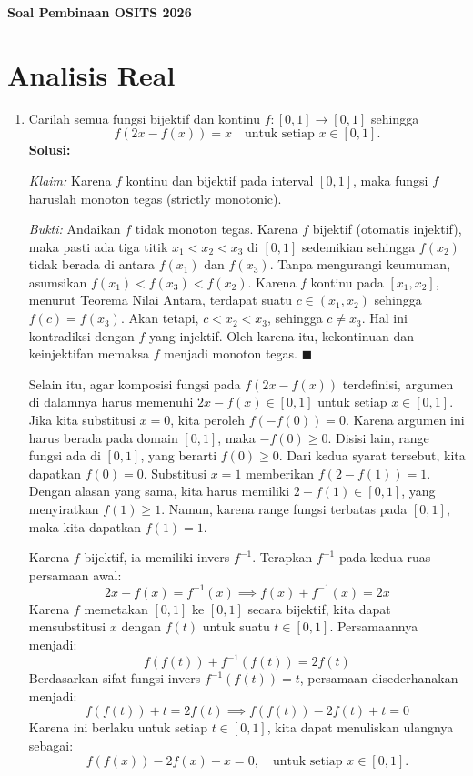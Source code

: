 \documentclass[11pt,a4paper]{article}
\begin{document}
\begin{center}
  \Large\textbf{Soal Pembinaan OSITS 2026}
\end{center}
\vspace{0.5cm}

\section*{Analisis Real}
\begin{enumerate}
  \item Carilah semua fungsi bijektif dan kontinu $f: [0,1] \to [0,1]$ sehingga
        \[
          f(2x-f(x))=x \quad \text{untuk setiap } x \in [0,1].
        \]
        \textbf{Solusi:}

        \textit{Klaim:} Karena $f$ kontinu dan bijektif pada interval $[0,1]$, maka fungsi $f$ haruslah monoton tegas (strictly monotonic).

        \textit{Bukti:} Andaikan $f$ tidak monoton tegas. Karena $f$ bijektif (otomatis injektif), maka pasti ada tiga titik $x_1 < x_2 < x_3$ di $[0,1]$ sedemikian sehingga $f(x_2)$ tidak berada di antara $f(x_1)$ dan $f(x_3)$. Tanpa mengurangi keumuman, asumsikan $f(x_1) < f(x_3) < f(x_2)$. Karena $f$ kontinu pada $[x_1, x_2]$, menurut Teorema Nilai Antara, terdapat suatu $c \in (x_1, x_2)$ sehingga $f(c) = f(x_3)$. Akan tetapi, $c < x_2 < x_3$, sehingga $c \neq x_3$. Hal ini kontradiksi dengan $f$ yang injektif. Oleh karena itu, kekontinuan dan keinjektifan memaksa $f$ menjadi monoton tegas. $\blacksquare$

        Selain itu, agar komposisi fungsi pada $f(2x-f(x))$ terdefinisi, argumen di dalamnya harus memenuhi $2x - f(x) \in [0,1]$ untuk setiap $x \in [0,1]$.
        Jika kita substitusi $x = 0$, kita peroleh $f(-f(0)) = 0$. Karena argumen ini harus berada pada domain $[0,1]$, maka $-f(0) \ge 0$. Disisi lain, range fungsi ada di $[0,1]$, yang berarti $f(0) \ge 0$. Dari kedua syarat tersebut, kita dapatkan $f(0) = 0$.
        Substitusi $x = 1$ memberikan $f(2 - f(1)) = 1$. Dengan alasan yang sama, kita harus memiliki $2 - f(1) \in [0,1]$, yang menyiratkan $f(1) \ge 1$. Namun, karena range fungsi terbatas pada $[0,1]$, maka kita dapatkan $f(1) = 1$.

        Karena $f$ bijektif, ia memiliki invers $f^{-1}$. Terapkan $f^{-1}$ pada kedua ruas persamaan awal:
        \[
          2x - f(x) = f^{-1}(x) \implies f(x) + f^{-1}(x) = 2x
        \]
        Karena $f$ memetakan $[0,1]$ ke $[0,1]$ secara bijektif, kita dapat mensubstitusi $x$ dengan $f(t)$ untuk suatu $t \in [0,1]$. Persamaannya menjadi:
        \[
          f(f(t)) + f^{-1}(f(t)) = 2f(t)
        \]
        Berdasarkan sifat fungsi invers $f^{-1}(f(t)) = t$, persamaan disederhanakan menjadi:
        \[
          f(f(t)) + t = 2f(t) \implies f(f(t)) - 2f(t) + t = 0
        \]
        Karena ini berlaku untuk setiap $t \in [0,1]$, kita dapat menuliskan ulangnya sebagai:
        \[
          f(f(x)) - 2f(x) + x = 0, \quad \text{untuk setiap } x \in [0,1].
        \]


\end{enumerate}
\end{document}
